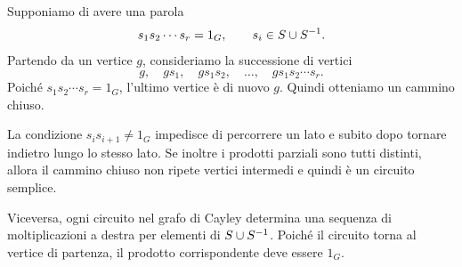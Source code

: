 \documentclass[a4paper]{article}
\begin{document}
\begin{snippetproof}{}
    Supponiamo di avere una parola
    \[
        s_1s_2\cdots s_r=1_G,
        \qquad
        s_i\in S\cup S^{-1}.
    \]
    Partendo da un vertice \(g\), consideriamo la successione di vertici
    \[
        g,\quad
        gs_1,\quad
        gs_1s_2,\quad
        \ldots,\quad
        gs_1s_2\cdots s_r.
    \]
    Poiché \(s_1s_2\cdots s_r=1_G\), l'ultimo vertice è di nuovo \(g\). Quindi otteniamo un cammino chiuso.

    La condizione \(s_i s_{i+1}\neq 1_G\) impedisce di percorrere un lato e subito dopo tornare indietro lungo lo stesso lato. Se inoltre i prodotti parziali sono tutti distinti, allora il cammino chiuso non ripete vertici intermedi e quindi è un circuito semplice.

    Viceversa, ogni circuito nel grafo di Cayley determina una sequenza di moltiplicazioni a destra per elementi di \(S\cup S^{-1}\). Poiché il circuito torna al vertice di partenza, il prodotto corrispondente deve essere \(1_G\).
\end{snippetproof}
\end{document}
